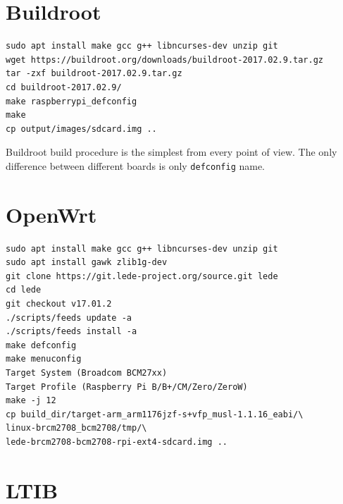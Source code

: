 \documentclass[printmode]{mgr}
\begin{document}
\section{Buildroot}


\begin{lstlisting}
sudo apt install make gcc g++ libncurses-dev unzip git 
wget https://buildroot.org/downloads/buildroot-2017.02.9.tar.gz
tar -zxf buildroot-2017.02.9.tar.gz
cd buildroot-2017.02.9/
make raspberrypi_defconfig
make
cp output/images/sdcard.img ..
\end{lstlisting}

Buildroot build procedure is the simplest from every point of view.
The only difference between different boards is only \verb|defconfig| name.







\section{OpenWrt}

\begin{lstlisting}
sudo apt install make gcc g++ libncurses-dev unzip git
sudo apt install gawk zlib1g-dev
git clone https://git.lede-project.org/source.git lede
cd lede
git checkout v17.01.2
./scripts/feeds update -a
./scripts/feeds install -a
make defconfig
make menuconfig
Target System (Broadcom BCM27xx)
Target Profile (Raspberry Pi B/B+/CM/Zero/ZeroW)
make -j 12
cp build_dir/target-arm_arm1176jzf-s+vfp_musl-1.1.16_eabi/\
linux-brcm2708_bcm2708/tmp/\
lede-brcm2708-bcm2708-rpi-ext4-sdcard.img ..
\end{lstlisting}



\section{LTIB}
\end{document}
